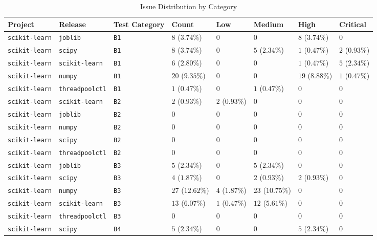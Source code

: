\begin{table}
\caption{Issue Distribution by Category}
\label{tab:issue-category-distribution}
\begin{tabular}{llllllll}
\toprule
Project & Release & Test Category & Count & Low & Medium & High & Critical \\
\midrule
\texttt{scikit-learn} & \texttt{joblib} & \texttt{B1} & $8$ ($3.74\%$) & $0$ & $0$ & $8$ ($3.74\%$) & $0$ \\
\texttt{scikit-learn} & \texttt{scipy} & \texttt{B1} & $8$ ($3.74\%$) & $0$ & $5$ ($2.34\%$) & $1$ ($0.47\%$) & $2$ ($0.93\%$) \\
\texttt{scikit-learn} & \texttt{scikit-learn} & \texttt{B1} & $6$ ($2.80\%$) & $0$ & $0$ & $1$ ($0.47\%$) & $5$ ($2.34\%$) \\
\texttt{scikit-learn} & \texttt{numpy} & \texttt{B1} & $20$ ($9.35\%$) & $0$ & $0$ & $19$ ($8.88\%$) & $1$ ($0.47\%$) \\
\texttt{scikit-learn} & \texttt{threadpoolctl} & \texttt{B1} & $1$ ($0.47\%$) & $0$ & $1$ ($0.47\%$) & $0$ & $0$ \\
\texttt{scikit-learn} & \texttt{scikit-learn} & \texttt{B2} & $2$ ($0.93\%$) & $2$ ($0.93\%$) & $0$ & $0$ & $0$ \\
\texttt{scikit-learn} & \texttt{joblib} & \texttt{B2} & $0$ & $0$ & $0$ & $0$ & $0$ \\
\texttt{scikit-learn} & \texttt{numpy} & \texttt{B2} & $0$ & $0$ & $0$ & $0$ & $0$ \\
\texttt{scikit-learn} & \texttt{scipy} & \texttt{B2} & $0$ & $0$ & $0$ & $0$ & $0$ \\
\texttt{scikit-learn} & \texttt{threadpoolctl} & \texttt{B2} & $0$ & $0$ & $0$ & $0$ & $0$ \\
\texttt{scikit-learn} & \texttt{joblib} & \texttt{B3} & $5$ ($2.34\%$) & $0$ & $5$ ($2.34\%$) & $0$ & $0$ \\
\texttt{scikit-learn} & \texttt{scipy} & \texttt{B3} & $4$ ($1.87\%$) & $0$ & $2$ ($0.93\%$) & $2$ ($0.93\%$) & $0$ \\
\texttt{scikit-learn} & \texttt{numpy} & \texttt{B3} & $27$ ($12.62\%$) & $4$ ($1.87\%$) & $23$ ($10.75\%$) & $0$ & $0$ \\
\texttt{scikit-learn} & \texttt{scikit-learn} & \texttt{B3} & $13$ ($6.07\%$) & $1$ ($0.47\%$) & $12$ ($5.61\%$) & $0$ & $0$ \\
\texttt{scikit-learn} & \texttt{threadpoolctl} & \texttt{B3} & $0$ & $0$ & $0$ & $0$ & $0$ \\
\texttt{scikit-learn} & \texttt{scipy} & \texttt{B4} & $5$ ($2.34\%$) & $0$ & $0$ & $5$ ($2.34\%$) & $0$ \\

\end{tabular}
\end{table}

